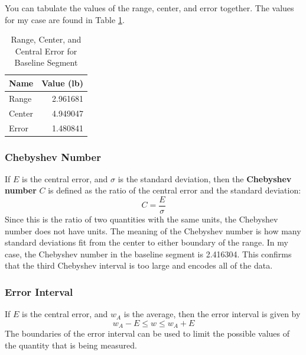 You can tabulate the values of the range, center, and error together. The values for my case are found in Table \ref{table:00.baseline.range}.
\begin{table}
    \centering
	\begin{tabular}{|l|r|} \hline
		\textbf{Name} & \textbf{Value (lb)} \\
		\hline
		Range & 2.961681 \\
	    Center & 4.949047 \\
		Error & 1.480841 \\
		\hline
	\end{tabular}
    \caption{Range, Center, and Central Error for Baseline Segment}
    \label{table:00.baseline.range}
\end{table}
\subsubsection{Chebyshev Number}
If $E$ is the central error, and $\sigma$ is the standard deviation, then the \textbf{Chebyshev number} $C$ is defined as the ratio of the central error and the standard deviation:
\begin{equation}
    C = \frac{E}{\sigma}
\end{equation}
Since this is the ratio of two quantities with the same units, the Chebyshev number does not have units. The meaning of the Chebyshev number is how many standard deviations fit from the center to either boundary of the range. In my case, the Chebyshev number in the baseline segment is 2.416304. This confirms that the third Chebyshev interval is too large and encodes all of the data.
\subsubsection{Error Interval}
If $E$ is the central error, and $w_{A}$ is the average, then the error interval is given by
\begin{equation}
    w_{A} - E \leq w \leq w_{A} + E
\end{equation}
The boundaries of the error interval can be used to limit the possible values of the quantity that is being measured.

